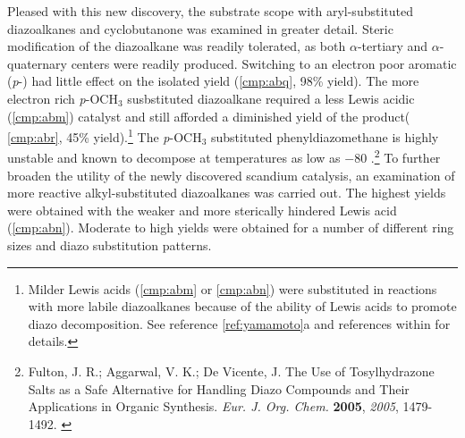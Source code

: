 Pleased with this new discovery, the substrate scope with aryl-substituted diazoalkanes and
cyclobutanone was examined in greater detail. Steric modification of the diazoalkane was readily
tolerated, as both $\alpha$-tertiary and $\alpha$-quaternary centers were readily produced.
Switching to an electron poor aromatic (\textit{p}-) had little effect on the isolated yield
(\ce{->}\ref{cmp:abq}, 98\% yield). The more electron rich \textit{p}-OCH$_3$ susbstituted
diazoalkane required a less Lewis acidic  (\ref{cmp:abm}) catalyst and still afforded a diminished yield of
the product(\ce{->} \ref{cmp:abr}, 45\% yield).\footnote{Milder Lewis acids (\ref{cmp:abm} or
\ref{cmp:abn}) were substituted in reactions with more labile diazoalkanes because of the ability of Lewis acids to promote diazo
decomposition. See reference \ref{ref:yamamoto}a and references within for details.} The
\textit{p}-OCH$_3$ substituted phenyldiazomethane is highly unstable and known to decompose at temperatures as low as $-$80
\degc.\footnote{{\frenchspacing Fulton, J. R.; Aggarwal, V. K.; De Vicente, J. The Use of
Tosylhydrazone Salts as a Safe Alternative for Handling Diazo Compounds and Their Applications in
Organic Synthesis. \textit{Eur. J. Org. Chem.} \textbf{2005}, \textit{2005}, 1479-1492.}
\label{ref:aggarwal}} To further broaden the utility of the newly discovered scandium catalysis, an
examination of more reactive alkyl-substituted diazoalkanes was carried out. The highest yields were obtained with the weaker and
more sterically hindered Lewis acid  (\ref{cmp:abn}). Moderate to high yields were
obtained for a number of different ring sizes and diazo substitution patterns.


